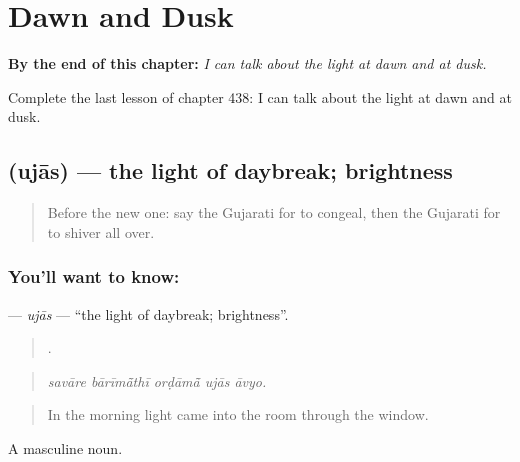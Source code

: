 
\chapter{Dawn and Dusk}
\label{ch:gu-dawn-and-dusk}

\begin{chapteropening}
\textbf{By the end of this chapter:} \emph{I can talk about the light at dawn and at dusk.}

Complete the last lesson of chapter 438: I can talk about the light at dawn and at dusk.
\end{chapteropening}

\section[\texorpdfstring{\gu{ઉજાસ} (ujās)}{ઉજાસ (ujās)}]{ (ujās) — the light of daybreak; brightness}

\label{lesson:GU-C438-ujas}



\begin{quote}
Before the new one: say the Gujarati for to congeal, then the Gujarati for to shiver all over.
\end{quote}

\subsection*{You'll want to know: }
\textbf{} — \emph{ujās} — \textquotedblleft{}the light of daybreak; brightness\textquotedblright{}.

\begin{quote}
    .
\end{quote}

\begin{quote}
\emph{savāre bārīmā̃thī orḍāmā̃ ujās āvyo.}
\end{quote}

\begin{quote}
In the morning light came into the room through the window.
\end{quote}

A masculine noun.

